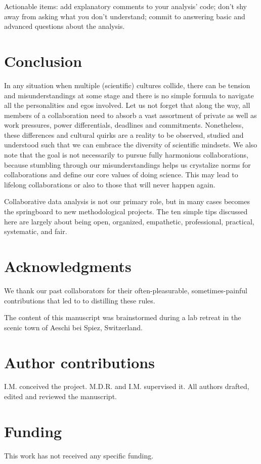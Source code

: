 \documentclass{article}
\begin{document}
Actionable items: add explanatory comments to your analysis’ code; don’t shy away from asking what you don’t understand; commit to answering basic and advanced questions about the analysis.

\section*{Conclusion} %

In any situation when multiple (scientific) cultures collide, there can be tension and misunderstandings at some stage and there is no simple formula to navigate all the personalities and egos involved. Let us not forget that along the way, all members of a collaboration need to absorb a vast assortment of private as well as work pressures, power differentials, deadlines and commitments. Nonetheless, these differences and cultural quirks are a reality to be observed, studied and understood such that we can embrace the diversity of scientific mindsets. We also note that the goal is not necessarily to pursue fully harmonious collaborations, because stumbling through our misunderstandings helps us crystalize norms for collaborations and define our core values of doing science. This may lead to lifelong collaborations or also to those that will never happen again.

Collaborative data analysis is not our primary role, but in many cases becomes the springboard to new methodological projects. The ten simple tips discussed here are largely about being open, organized, empathetic, professional, practical, systematic, and fair.

\section*{Acknowledgments} %

We thank our past collaborators for their often-pleasurable, sometimes-painful contributions that led to to distilling these rules.

The content of this manuscript was brainstormed during a lab retreat in the scenic town of Aeschi bei Spiez, Switzerland.

\section*{Author contributions}

I.M. conceived the project. M.D.R. and I.M. supervised it. All authors drafted, edited and reviewed the manuscript.

\section*{Funding}

This work has not received any specific funding.

  
  

\clearpage

\appendix


\end{document}
